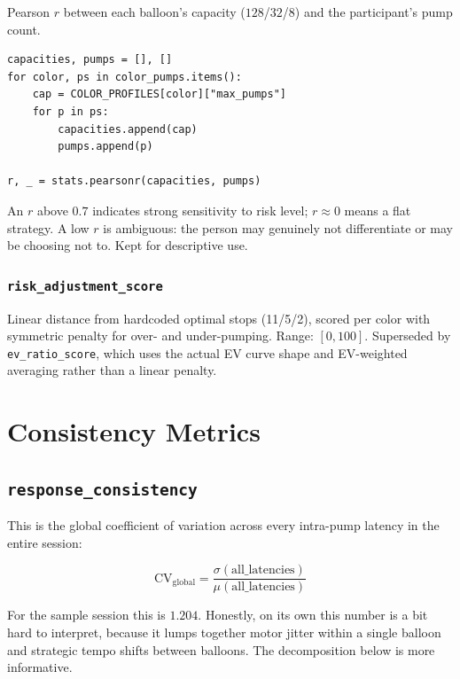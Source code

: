 \documentclass[11pt,a4paper]{article}
\begin{document}
Pearson $r$ between each balloon's capacity ($128$/$32$/$8$) and the
participant's pump count.

\begin{lstlisting}[style=pythonstyle]
capacities, pumps = [], []
for color, ps in color_pumps.items():
    cap = COLOR_PROFILES[color]["max_pumps"]
    for p in ps:
        capacities.append(cap)
        pumps.append(p)

r, _ = stats.pearsonr(capacities, pumps)
\end{lstlisting}

An $r$ above $0.7$ indicates strong sensitivity to risk level;
$r \approx 0$ means a flat strategy. A low $r$ is ambiguous: the person
may genuinely not differentiate or may be choosing not to. Kept for
descriptive use.


\subsubsection*{\texttt{risk\_adjustment\_score}}

Linear distance from hardcoded optimal stops (11/5/2), scored per color
with symmetric penalty for over- and under-pumping. Range: $[0, 100]$.
Superseded by \texttt{ev\_ratio\_score}, which uses the actual EV curve
shape and EV-weighted averaging rather than a linear penalty.


\section{Consistency Metrics}

\subsection{\texttt{response\_consistency}}

This is the global coefficient of variation across every intra-pump latency
in the entire session:

\begin{equation}
    \text{CV}_\text{global} = \frac{\sigma(\text{all\_latencies})}{\mu(\text{all\_latencies})}
\end{equation}

For the sample session this is $1.204$. Honestly, on its own this number is
a bit hard to interpret, because it lumps together motor jitter within a
single balloon and strategic tempo shifts between balloons. The decomposition
below is more informative.
\end{document}
